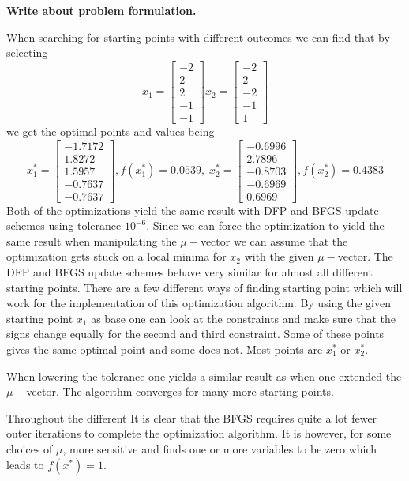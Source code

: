 
\textbf{Write about problem formulation.}


When searching for starting points with different outcomes we can find that by selecting 
$$x_1=\left[
\begin{array}{c}
-2\\2\\2\\-1\\-1
\end{array}
\right] x_2 =\left[
\begin{array}{c}
-2\\2\\-2\\-1\\1
\end{array}
\right] $$ we get the optimal points and values being $$x_1^*=
\left[
\begin{array}{c}
-1.7172\\1.8272\\1.5957\\-0.7637\\-0.7637
\end{array}
\right], f(x_1^*)=0.0539, \;x_2^* = \left[
\begin{array}{c}
-0.6996\\ 2.7896\\-0.8703\\-0.6969\\0.6969
\end{array}
\right],f(x_2^*)=0.4383$$
Both of the optimizations yield the same result with DFP and BFGS update schemes using tolerance $10^{-6}$. Since we can force the optimization to yield the same result when manipulating the $\mu-$vector we can assume that the optimization gets stuck on a local minima for $x_2$ with the given $\mu-$vector. The DFP and BFGS update schemes behave very similar for almost all different starting points. There are a few different ways of finding starting point which will work for the implementation of this optimization algorithm. By using the given starting point $x_1$ as base one can look at the constraints and make sure that the signs change equally for the second and third constraint. Some of these points gives the same optimal point and some does not. Most points are $x_1^*$ or $x_2^*$. 

When lowering the tolerance one yields a similar result as when one extended the $\mu-$vector. The algorithm converges for many more starting points.

Throughout the different It is clear that the BFGS requires quite a lot fewer outer iterations to complete the optimization algorithm. It is however, for some choices of $\mu$, more sensitive and finds one or more variables to be zero which leads to $f(x^*)=1$.


